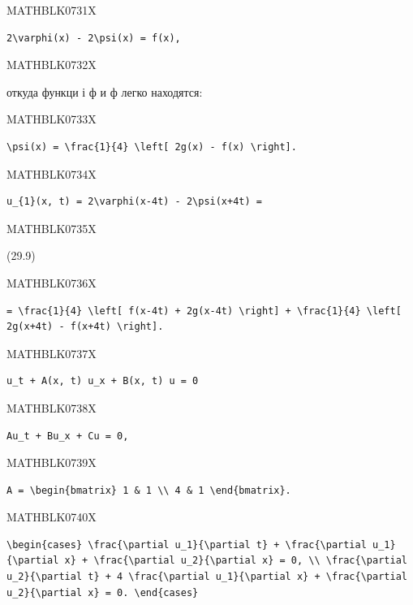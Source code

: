 \documentclass[
  ukrainian,
]{article}
\begin{document}
MATHBLK0731X

\begin{verbatim}
2\varphi(x) - 2\psi(x) = f(x),
\end{verbatim}

MATHBLK0732X

откуда функци і ф и ф легко находятся:

MATHBLK0733X

\begin{verbatim}
\psi(x) = \frac{1}{4} \left[ 2g(x) - f(x) \right].
\end{verbatim}

MATHBLK0734X

\begin{verbatim}
u_{1}(x, t) = 2\varphi(x-4t) - 2\psi(x+4t) =
\end{verbatim}

MATHBLK0735X

(29.9)

MATHBLK0736X

\begin{verbatim}
= \frac{1}{4} \left[ f(x-4t) + 2g(x-4t) \right] + \frac{1}{4} \left[ 2g(x+4t) - f(x+4t) \right].
\end{verbatim}

MATHBLK0737X

\begin{verbatim}
u_t + A(x, t) u_x + B(x, t) u = 0
\end{verbatim}

MATHBLK0738X

\begin{verbatim}
Au_t + Bu_x + Cu = 0,
\end{verbatim}

MATHBLK0739X

\begin{verbatim}
A = \begin{bmatrix} 1 & 1 \\ 4 & 1 \end{bmatrix}.
\end{verbatim}

MATHBLK0740X

\begin{verbatim}
\begin{cases} \frac{\partial u_1}{\partial t} + \frac{\partial u_1}{\partial x} + \frac{\partial u_2}{\partial x} = 0, \\ \frac{\partial u_2}{\partial t} + 4 \frac{\partial u_1}{\partial x} + \frac{\partial u_2}{\partial x} = 0. \end{cases}
\end{verbatim}
\end{document}
